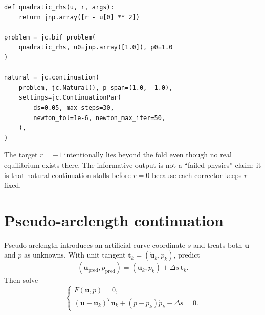\documentclass[11pt,oneside]{book}
\newcommand{\state}{\bm{u}}
\newcommand{\residual}{F}
\begin{document}
\begin{lstlisting}
def quadratic_rhs(u, r, args):
    return jnp.array([r - u[0] ** 2])

problem = jc.bif_problem(
    quadratic_rhs, u0=jnp.array([1.0]), p0=1.0
)

natural = jc.continuation(
    problem, jc.Natural(), p_span=(1.0, -1.0),
    settings=jc.ContinuationPar(
        ds=0.05, max_steps=30,
        newton_tol=1e-6, newton_max_iter=50,
    ),
)
\end{lstlisting}

The target $r=-1$ intentionally lies beyond the fold even though no real
equilibrium exists there. The informative output is not a ``failed physics''
claim; it is that natural continuation stalls before $r=0$ because each
corrector keeps $r$ fixed.

\section{Pseudo-arclength continuation}

Pseudo-arclength introduces an artificial curve coordinate $s$ and treats both
$\state$ and $p$ as unknowns. With unit tangent
$\bm{t}_k=(\dot{\state}_k,\dot p_k)$, predict
\[
  (\state_{\mathrm{pred}},p_{\mathrm{pred}})
  =(\state_k,p_k)+\Delta s\,\bm{t}_k.
\]
Then solve
\[
\begin{cases}
\residual(\state,p)=0,\\
(\state-\state_k)^T\dot{\state}_k+
(p-p_k)\dot p_k-\Delta s=0.
\end{cases}
\]

\begin{center}
\end{center}
\end{document}
